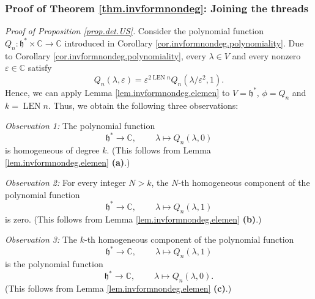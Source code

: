 \documentclass[etingof-lie.tex]{subfiles}
\begin{document}
\subsubsection{Proof of Theorem \ref{thm.invformnondeg}: Joining the threads}

\textit{Proof of Proposition \ref{prop.det.US}.} Consider the polynomial
function $Q_{n}:\mathfrak{h}^{\ast}\times\mathbb{C}\rightarrow\mathbb{C}$
introduced in Corollary \ref{cor.invformnondeg.polynomiality}. Due to
Corollary \ref{cor.invformnondeg.polynomiality}, every $\lambda\in V$ and
every nonzero $\varepsilon\in\mathbb{C}$ satisfy%
\[
Q_{n}\left(  \lambda,\varepsilon\right)  =\varepsilon^{2\operatorname*{LEN}%
n}Q_{n}\left(  \lambda/\varepsilon^{2},1\right)  .
\]
Hence, we can apply Lemma \ref{lem.invformnondeg.elemen} to $V=\mathfrak{h}%
^{\ast}$, $\phi=Q_{n}$ and $k=\operatorname*{LEN}n$. Thus, we obtain the
following three observations:

\textit{Observation 1:} The polynomial function
\[
\mathfrak{h}^{\ast}\rightarrow\mathbb{C},\ \ \ \ \ \ \ \ \ \ \lambda\mapsto
Q_{n}\left(  \lambda,0\right)
\]
is homogeneous of degree $k$. (This follows from Lemma
\ref{lem.invformnondeg.elemen} \textbf{(a)}.)

\textit{Observation 2:} For every integer $N>k$, the $N$-th homogeneous
component of the polynomial function%
\[
\mathfrak{h}^{\ast}\rightarrow\mathbb{C},\ \ \ \ \ \ \ \ \ \ \lambda\mapsto
Q_{n}\left(  \lambda,1\right)
\]
is zero. (This follows from Lemma \ref{lem.invformnondeg.elemen} \textbf{(b)}.)

\textit{Observation 3:} The $k$-th homogeneous component of the polynomial
function%
\[
\mathfrak{h}^{\ast}\rightarrow\mathbb{C},\ \ \ \ \ \ \ \ \ \ \lambda\mapsto
Q_{n}\left(  \lambda,1\right)
\]
is the polynomial function%
\[
\mathfrak{h}^{\ast}\rightarrow\mathbb{C},\ \ \ \ \ \ \ \ \ \ \lambda\mapsto
Q_{n}\left(  \lambda,0\right)  .
\]
(This follows from Lemma \ref{lem.invformnondeg.elemen} \textbf{(c)}.)
\end{document}
